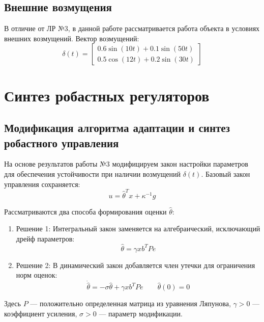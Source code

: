 \documentclass[a4paper,12pt]{article}
\begin{document}
\subsection{Внешние возмущения}
В отличие от ЛР №3, в данной работе рассматривается работа объекта в условиях внешних возмущений. Вектор возмущений:
\begin{equation}
	\delta(t) = \begin{bmatrix} 0.6\sin(10t) + 0.1\sin(50t) \\ 0.5\cos(12t) + 0.2\sin(30t) \end{bmatrix}
\end{equation}



 \newpage
 
 \section{Синтез робастных регуляторов}

\subsection{Модификация алгоритма адаптации и синтез робастного управления}

На основе результатов работы №3 модифицируем закон настройки параметров для обеспечения устойчивости при наличии возмущений $\delta(t)$. Базовый закон управления сохраняется:
\begin{equation}
	u = \hat{\theta}^T x + \kappa^{-1} g
\end{equation}

Рассматриваются два способа формирования оценки $\hat{\theta}$:


\begin{enumerate}
	\item Решение 1:  Интегральный закон заменяется на алгебраический, исключающий дрейф параметров:
	\begin{equation}
		\hat{\theta} = \gamma x b^T P e
	\end{equation}
	
	\item Решение 2: В динамический закон добавляется член утечки для ограничения норм оценок:
	\begin{equation}
		\dot{\hat{\theta}} = -\sigma \hat{\theta} + \gamma x b^T P e \qquad \hat{\theta}(0) = 0
	\end{equation}
	
\end{enumerate}
Здесь $P$ --- положительно определенная матрица из уравнения Ляпунова, $\gamma > 0$ --- коэффициент усиления, $\sigma > 0$ --- параметр модификации.
\end{document}
